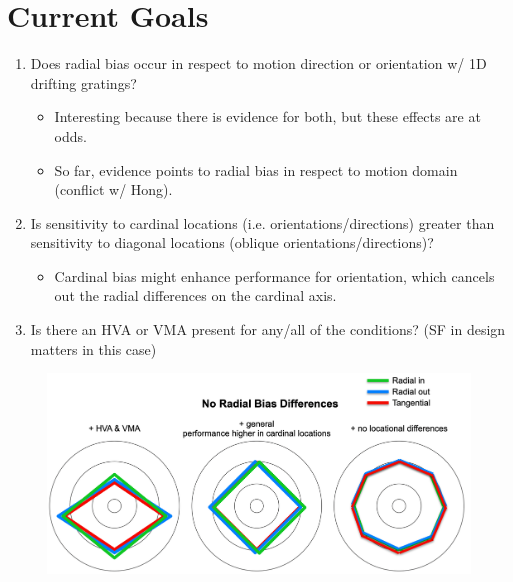 \documentclass[11pt]{article} %
\begin{document}
\section{Current Goals} 
\begin{enumerate}
	\item Does radial bias occur in respect to motion direction or orientation w/ 1D drifting gratings? 
	\begin{itemize}
	\item{Interesting because there is evidence for both, but these effects are at odds.} 
	\item{So far, evidence points to radial bias in respect to motion domain (conflict w/ Hong).}
	\end{itemize}
	\item Is sensitivity to cardinal locations (i.e. orientations/directions) greater than sensitivity to diagonal locations (oblique orientations/directions)? 
	\begin{itemize}
	\item{Cardinal bias might enhance performance for orientation, which cancels out the radial differences on the cardinal axis.}
	\end{itemize}
	\item Is there an HVA or VMA present for any/all of the conditions? (SF in design matters in this case)
	\end{enumerate}
	\begin{figure}[H]
	\centering %
	\includegraphics[scale=.25]{Images/Cartoon1.png}
	\end{figure}
\end{document}
